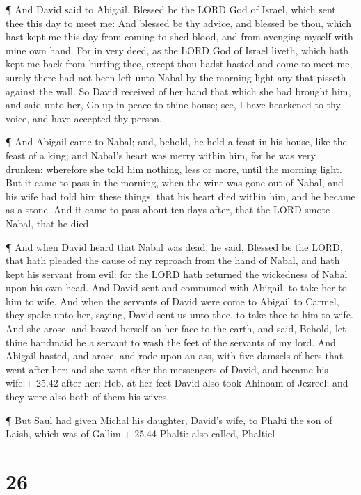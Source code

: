  ¶ And David said to Abigail, Blessed be the LORD God of
Israel, which sent thee this day to meet me:  And blessed
be thy advice, and blessed be thou, which hast kept me this day from
coming to shed blood, and from avenging myself with mine own hand.
 For in very deed, as the LORD God of Israel liveth, which
hath kept me back from hurting thee, except thou hadst hasted and come
to meet me, surely there had not been left unto Nabal by the morning
light any that pisseth against the wall.  So David received
of her hand that which she had brought him, and said unto her, Go up in
peace to thine house; see, I have hearkened to thy voice, and have
accepted thy person.

 ¶ And Abigail came to Nabal; and, behold, he held a feast
in his house, like the feast of a king; and Nabal's heart was merry
within him, for he was very drunken: wherefore she told him nothing,
less or more, until the morning light.  But it came to pass
in the morning, when the wine was gone out of Nabal, and his wife had
told him these things, that his heart died within him, and he became as
a stone.  And it came to pass about ten days after, that
the LORD smote Nabal, that he died.

 ¶ And when David heard that Nabal was dead, he said,
Blessed be the LORD, that hath pleaded the cause of my reproach from the
hand of Nabal, and hath kept his servant from evil: for the LORD hath
returned the wickedness of Nabal upon his own head. And David sent and
communed with Abigail, to take her to him to wife.  And
when the servants of David were come to Abigail to Carmel, they spake
unto her, saying, David sent us unto thee, to take thee to him to wife.
 And she arose, and bowed herself on her face to the earth,
and said, Behold, let thine handmaid be a servant to wash the feet of
the servants of my lord.  And Abigail hasted, and arose,
and rode upon an ass, with five damsels of hers that went after her; and
she went after the messengers of David, and became his wife.+ 25.42
after her: Heb. at her feet  David also took Ahinoam of
Jezreel; and they were also both of them his wives.

 ¶ But Saul had given Michal his daughter, David's wife, to
Phalti the son of Laish, which was of Gallim.+ 25.44 Phalti: also
called, Phaltiel

\hypertarget{section-25}{%
\section{26}\label{section-25}}

